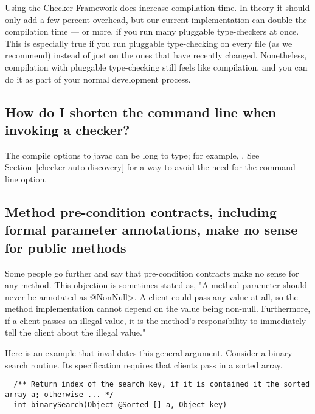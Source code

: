 Using the Checker Framework does increase compilation time.  In theory it
should only add a few percent overhead, but our current implementation
can double the compilation time --- or more, if you run many pluggable
type-checkers at once.  This is especially true if you run pluggable
type-checking on every file (as we recommend) instead of just on the ones
that have recently changed.
Nonetheless, compilation with pluggable type-checking still feels like
compilation, and you can do it as part of your normal development process.


\subsection{How do I shorten the command line when invoking a checker?\label{faq-shorten-command-line}}

\begin{sloppypar}
The compile options to javac can be long to type; for example,
.
See Section~\ref{checker-auto-discovery} for a way to avoid the need for
the  command-line option.
\end{sloppypar}


\subsection{Method pre-condition contracts, including formal parameter annotations, make no sense for public methods\label{faq-pre-conditions}}

Some people go further and say that pre-condition contracts make no sense
for any method.  This objection is sometimes stated as, "A method parameter
should never be annotated as \<@NonNull>.  A client could pass any value at
all, so the method implementation cannot depend on the value being
non-null.  Furthermore, if a client passes an illegal value, it is the
method's responsibility to immediately tell the client about the illegal
value."

Here is an example that invalidates this general argument.  Consider a
binary search routine.  Its specification requires that clients pass in a
sorted array.

\begin{smaller}
\begin{Verbatim}
  /** Return index of the search key, if it is contained it the sorted array a; otherwise ... */
  int binarySearch(Object @Sorted [] a, Object key)
\end{Verbatim}
\end{smaller}

